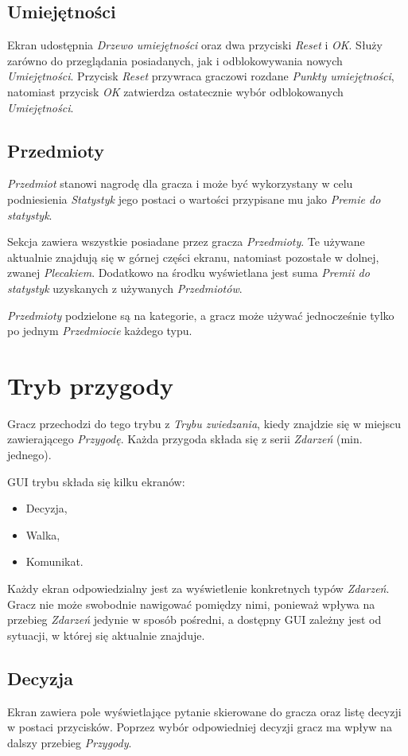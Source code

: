 \documentclass[openright]{xmgr}
\begin{document}
\subsection*{Umiejętności}
Ekran udostępnia \textit{Drzewo umiejętności} oraz dwa przyciski \textit{Reset} i \textit{OK}. Służy zarówno do przeglądania posiadanych, jak i odblokowywania nowych \textit{Umiejętności}. Przycisk \textit{Reset} przywraca graczowi rozdane \textit{Punkty umiejętności}, natomiast przycisk \textit{OK} zatwierdza ostatecznie wybór odblokowanych \textit{Umiejętności}.
\subsection*{Przedmioty}
\textit{Przedmiot} stanowi nagrodę dla gracza i może być wykorzystany w celu podniesienia \textit{Statystyk} jego postaci o wartości przypisane mu jako \textit{Premie do statystyk}.

Sekcja zawiera wszystkie posiadane przez gracza \textit{Przedmioty}. Te używane aktualnie znajdują się w górnej części ekranu, natomiast pozostałe w dolnej, zwanej \textit{Plecakiem}. Dodatkowo na środku wyświetlana jest suma \textit{Premii do statystyk} uzyskanych z używanych \textit{Przedmiotów}.

\textit{Przedmioty} podzielone są na kategorie, a gracz może używać jednocześnie tylko po jednym \textit{Przedmiocie} każdego typu.
\section{Tryb przygody}

Gracz przechodzi do tego trybu z \textit{Trybu zwiedzania}, kiedy znajdzie się w miejscu zawierającego \textit{Przygodę}. Każda przygoda składa się z serii \textit{Zdarzeń} (min. jednego).

GUI trybu składa się kilku ekranów:
\begin{itemize}
	\item Decyzja,
	\item Walka,
	\item Komunikat.
\end{itemize}

Każdy ekran odpowiedzialny jest za wyświetlenie konkretnych typów \textit{Zdarzeń}. Gracz nie może swobodnie nawigować pomiędzy nimi, ponieważ wpływa na przebieg \textit{Zdarzeń} jedynie w sposób pośredni, a dostępny GUI zależny jest od sytuacji, w której się aktualnie znajduje.
\subsection*{Decyzja}
Ekran zawiera pole wyświetlające pytanie skierowane do gracza oraz listę decyzji w postaci przycisków. Poprzez wybór odpowiedniej decyzji gracz ma wpływ na dalszy przebieg \textit{Przygody}.
\end{document}
